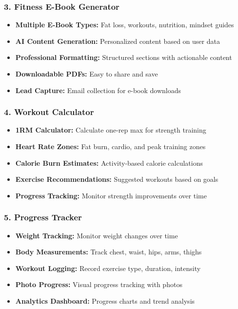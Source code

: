 \documentclass[12pt,a4paper]{article}
\begin{document}
\subsubsection{3. Fitness E-Book Generator}
\begin{itemize}
    \item \textbf{Multiple E-Book Types:} Fat loss, workouts, nutrition, mindset guides
    \item \textbf{AI Content Generation:} Personalized content based on user data
    \item \textbf{Professional Formatting:} Structured sections with actionable content
    \item \textbf{Downloadable PDFs:} Easy to share and save
    \item \textbf{Lead Capture:} Email collection for e-book downloads
\end{itemize}

\subsubsection{4. Workout Calculator}
\begin{itemize}
    \item \textbf{1RM Calculator:} Calculate one-rep max for strength training
    \item \textbf{Heart Rate Zones:} Fat burn, cardio, and peak training zones
    \item \textbf{Calorie Burn Estimates:} Activity-based calorie calculations
    \item \textbf{Exercise Recommendations:} Suggested workouts based on goals
    \item \textbf{Progress Tracking:} Monitor strength improvements over time
\end{itemize}

\subsubsection{5. Progress Tracker}
\begin{itemize}
    \item \textbf{Weight Tracking:} Monitor weight changes over time
    \item \textbf{Body Measurements:} Track chest, waist, hips, arms, thighs
    \item \textbf{Workout Logging:} Record exercise type, duration, intensity
    \item \textbf{Photo Progress:} Visual progress tracking with photos
    \item \textbf{Analytics Dashboard:} Progress charts and trend analysis
\end{itemize}
\end{document}
